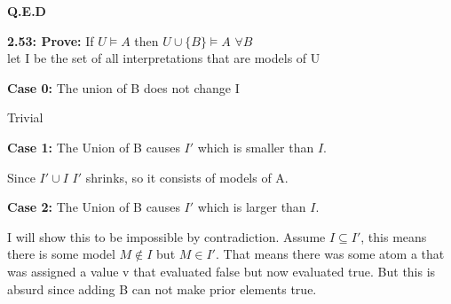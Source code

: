 \documentclass[letterpaper]{article}
\begin{document}
\textbf{Q.E.D}
\pagebreak

\textbf{2.53: Prove:}
If $U \vDash A$ then $U \cup \{B\} \vDash A $ $\forall B $
\\[1ex]

let I be the set of all interpretations that are models of U

\textbf{Case 0:}
The union of B does not change I

Trivial

\textbf{Case 1:} The Union of B causes $I'$ which is smaller than $I$. 

Since $I' \cup I$ $I'$ shrinks, so it consists of models of A.

\textbf{Case 2:} The Union of B causes $I'$ which is larger than $I$. 

I will show this to be impossible by contradiction.  Assume $I \subseteq I'$,
this means there is some model $ M \notin I $ but $M \in I'$. 
That means there was some atom a that was assigned a value v that evaluated 
false but now evaluated true. But this is absurd since adding B can not make
prior elements true.
\end{document}
